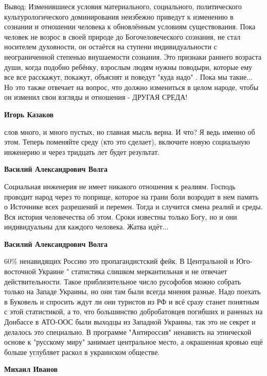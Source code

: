 \begin{itemize}
\begin{itemize}
Вывод: Изменившиеся условия материального, социального, политического
культурологического доминирования неизбежно приведут к изменению в сознании и
отношении человека к обновлённым условиям существования. Пока человек не возрос
в своей природе до Богочеловеческого сознания, не стал носителем духовности, он
остаётся на ступени индивидуальности с неограниченной степенью внушаемости
сознания. Это признаки раннего возраста души, когда подобно ребёнку, взрослым
людям нужны поводыри, которые ему все все расскажут, покажут, объяснят и
поведут "куда надо" . Пока мы такие... Но это также отвечает на вопрос, что
должно измениться в целом народе, чтобы он изменил свои взгляды и отношения -
ДРУГАЯ СРЕДА!

\textbf{Игорь Казаков} 

слов много, и много пустых, но главная мысль верна. И что? Я ведь именно об
этом. Теперь поменяйте среду (кто это сделает), включите новую социальную
инженерию и через тридцать лет будет результат.

\textbf{Василий Александрович Волга} 

Социальная инженерия не имеет никакого отношения к реалиям. Господь проводит
народ через то поприще, которое на грани боли возродит в нем память о Источнике
всех разрешений и перемен. Тогда и случится смена реалий и среды. Вся история
человечества об этом. Сроки известны только Богу, но и они индивидуальны для
каждого человека. Жатва идёт...

\textbf{Василий Александрович Волга} 

60\% ненавидящих Россию это пропагандистский фейк. В Центральной и Юго-восточной
Украине " статистика слишком меркантильная и не отвечает действительности.
Такое приблизительное число русофобов можно собрать только на Западе Украины,
но они там были всегда мнения разные. Надо поехать в Буковель и спросить ждут
ли они туристов из РФ и всё сразу станет понятным с этой статистикой, а то, что
большинство добробатовцев погибших и раненых на Донбассе в АТО-ООС были выходцы
из Западной Украины, так это не секрет и делалось это специально. В программе
"Антироссия" ненависть на этнической основе к "русскому миру" занимает
центральное место, а окрашенная кровью ещё больше углубляет раскол в украинском
обществе.

\end{itemize} %

\textbf{Михаил Иванов}


\end{itemize}
